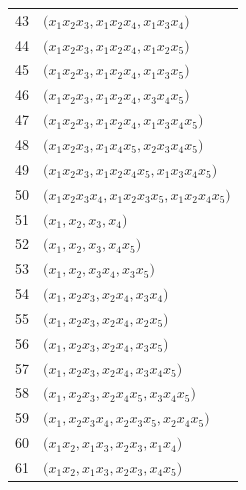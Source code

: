 {\begin{longtable}{@{}r>{\raggedright\arraybackslash}p{}@{}}
43 & \(\bigl(x_{1}x_{2}x_{3},\allowbreak x_{1}x_{2}x_{4},\allowbreak x_{1}x_{3}x_{4}\bigr)\) \\
44 & \(\bigl(x_{1}x_{2}x_{3},\allowbreak x_{1}x_{2}x_{4},\allowbreak x_{1}x_{2}x_{5}\bigr)\) \\
45 & \(\bigl(x_{1}x_{2}x_{3},\allowbreak x_{1}x_{2}x_{4},\allowbreak x_{1}x_{3}x_{5}\bigr)\) \\
46 & \(\bigl(x_{1}x_{2}x_{3},\allowbreak x_{1}x_{2}x_{4},\allowbreak x_{3}x_{4}x_{5}\bigr)\) \\
47 & \(\bigl(x_{1}x_{2}x_{3},\allowbreak x_{1}x_{2}x_{4},\allowbreak x_{1}x_{3}x_{4}x_{5}\bigr)\) \\
48 & \(\bigl(x_{1}x_{2}x_{3},\allowbreak x_{1}x_{4}x_{5},\allowbreak x_{2}x_{3}x_{4}x_{5}\bigr)\) \\
49 & \(\bigl(x_{1}x_{2}x_{3},\allowbreak x_{1}x_{2}x_{4}x_{5},\allowbreak x_{1}x_{3}x_{4}x_{5}\bigr)\) \\
50 & \(\bigl(x_{1}x_{2}x_{3}x_{4},\allowbreak x_{1}x_{2}x_{3}x_{5},\allowbreak x_{1}x_{2}x_{4}x_{5}\bigr)\) \\
51 & \(\bigl(x_{1},\allowbreak x_{2},\allowbreak x_{3},\allowbreak x_{4}\bigr)\) \\
52 & \(\bigl(x_{1},\allowbreak x_{2},\allowbreak x_{3},\allowbreak x_{4}x_{5}\bigr)\) \\
53 & \(\bigl(x_{1},\allowbreak x_{2},\allowbreak x_{3}x_{4},\allowbreak x_{3}x_{5}\bigr)\) \\
54 & \(\bigl(x_{1},\allowbreak x_{2}x_{3},\allowbreak x_{2}x_{4},\allowbreak x_{3}x_{4}\bigr)\) \\
55 & \(\bigl(x_{1},\allowbreak x_{2}x_{3},\allowbreak x_{2}x_{4},\allowbreak x_{2}x_{5}\bigr)\) \\
56 & \(\bigl(x_{1},\allowbreak x_{2}x_{3},\allowbreak x_{2}x_{4},\allowbreak x_{3}x_{5}\bigr)\) \\
57 & \(\bigl(x_{1},\allowbreak x_{2}x_{3},\allowbreak x_{2}x_{4},\allowbreak x_{3}x_{4}x_{5}\bigr)\) \\
58 & \(\bigl(x_{1},\allowbreak x_{2}x_{3},\allowbreak x_{2}x_{4}x_{5},\allowbreak x_{3}x_{4}x_{5}\bigr)\) \\
59 & \(\bigl(x_{1},\allowbreak x_{2}x_{3}x_{4},\allowbreak x_{2}x_{3}x_{5},\allowbreak x_{2}x_{4}x_{5}\bigr)\) \\
60 & \(\bigl(x_{1}x_{2},\allowbreak x_{1}x_{3},\allowbreak x_{2}x_{3},\allowbreak x_{1}x_{4}\bigr)\) \\
61 & \(\bigl(x_{1}x_{2},\allowbreak x_{1}x_{3},\allowbreak x_{2}x_{3},\allowbreak x_{4}x_{5}\bigr)\) \\

\end{longtable}}

